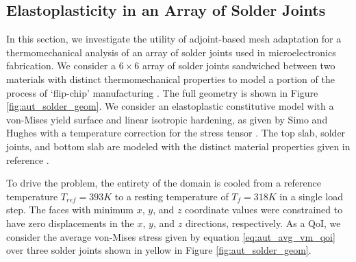 \subsection{Elastoplasticity in an Array of Solder Joints}

In this section, we investigate the utility of adjoint-based mesh
adaptation for a thermomechanical analysis of an array of solder
joints used in microelectronics fabrication. We consider a
$6 \times 6$ array of solder joints sandwiched between two materials
with distinct thermomechanical properties
to model a portion of the process of `flip-chip'
manufacturing \cite{bloomfield2017component}. The full geometry
is shown in Figure \ref{fig:aut_solder_geom}. We consider
an elastoplastic constitutive model with a von-Mises yield
surface and linear isotropic hardening, as given by
Simo and Hughes \cite{simo1998computational} with a temperature
correction for the stress tensor \cite{li2017simulation}. The top
slab, solder joints, and bottom slab are modeled with the
distinct material properties given in reference
\cite{bloomfield2017component}.

To drive the problem, the entirety of the domain is cooled
from a reference temperature $T_{ref} = 393K$ to a
resting temperature of $T_{f} = 318K$ in a single load
step. The faces with minimum $x$, $y$, and $z$ coordinate
values were constrained to have zero displacements in
the $x$, $y$, and $z$ directions, respectively. As a
QoI, we consider the average von-Mises stress given by
equation \eqref{eq:aut_avg_vm_qoi} over three solder joints
shown in yellow in Figure \ref{fig:aut_solder_geom}.

